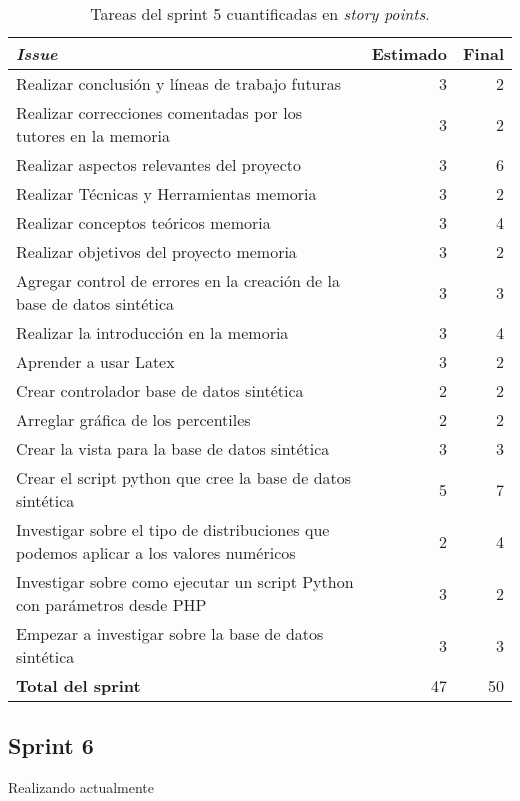 \begin{table}[H]
	 \begin{tabularx}{\linewidth}{X r r}
	 	\toprule \textbf{\textit{Issue}} & \textbf{Estimado} & \textbf{Final}\\
	 	\toprule
        Realizar conclusión y líneas de trabajo futuras & 3 & 2 \\
        Realizar correcciones comentadas por los tutores en la memoria & 3 & 2  \\
        Realizar aspectos relevantes del proyecto & 3 & 6 \\
        Realizar Técnicas y Herramientas memoria & 3 & 2 \\
        Realizar conceptos teóricos memoria & 3 & 4 \\
        Realizar objetivos del proyecto memoria & 3 & 2 \\
        Agregar control de errores en la creación de la base de datos sintética & 3 & 3 \\
        Realizar la introducción en la memoria & 3 & 4 \\
        Aprender a usar Latex & 3 & 2 \\
        Crear controlador base de datos sintética & 2 & 2 \\
        Arreglar gráfica de los percentiles & 2 & 2 \\
        Crear la vista para la base de datos sintética & 3 & 3 \\
        Crear el script python que cree la base de datos sintética & 5 & 7 \\
        Investigar sobre el tipo de distribuciones que podemos aplicar a los valores numéricos & 2 & 4 \\
        Investigar sobre como ejecutar un script Python con parámetros desde PHP & 3 & 2 \\
        Empezar a investigar sobre la base de datos sintética & 3 & 3 \\
        \midrule
	    \textbf{Total del sprint} & 47 & 50 \\
	 	\bottomrule
	 \end{tabularx}
	 \caption{Tareas del sprint 5 cuantificadas en \textit{story points}.}
\end{table}

\subsection{Sprint 6}

Realizando actualmente

